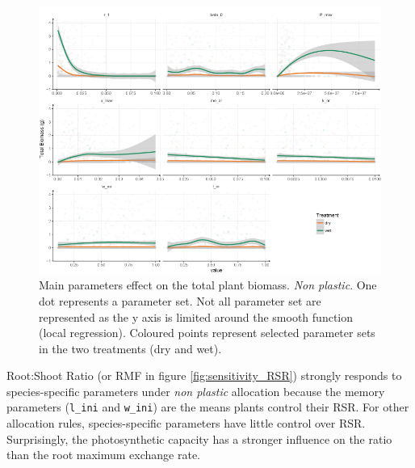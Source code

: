 \begin{figure}\label{fig:sensitivity_BM}
\includegraphics[width = \textwidth]{./2_PP/Figures/Calibration/par_effect_none_BM.png}
\caption{Main parameters effect on the total plant biomass. \textit{Non plastic}. One dot represents a parameter set. Not all parameter set are represented as the y axis is limited around the smooth function (local regression). Coloured points represent selected parameter sets in the two treatments (\textcolor{myOrange}{dry} and \textcolor{myGreen}{wet}).}
\end{figure}

Root:Shoot Ratio (or RMF in figure \ref{fig:sensitivity_RSR}) strongly responds to species-specific parameters under \textit{non plastic} allocation because the memory parameters (\texttt{l\_ini} and \texttt{w\_ini}) are the means plants control their RSR. For other allocation rules, species-specific parameters have little control over RSR. Surprisingly, the photosynthetic capacity has a stronger influence on the ratio than the root maximum exchange rate.


